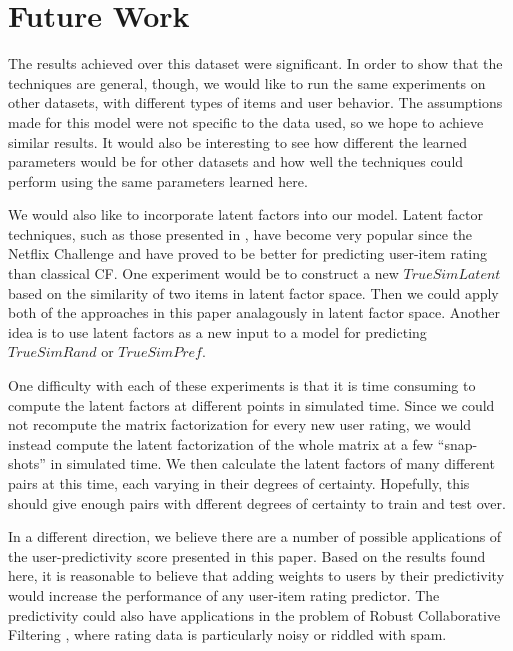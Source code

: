 \documentclass[11pt]{article}
\begin{document}
{\section*{Future Work}
The results achieved over this dataset were significant. In order to show that
the techniques are general, though, we would like to run the same experiments on
other datasets, with different types of items and user behavior. The 
assumptions made for this model were not specific to the data used, so we 
hope to achieve similar results. It would also be interesting to see how 
different the learned parameters would be for other datasets and how well 
the techniques could perform using the same parameters learned here.

We would also like to incorporate latent factors into our model.
Latent factor techniques, such as those presented in \cite{Koren2009}, have
become very popular since the Netflix Challenge and have proved to be better for
predicting user-item rating than classical CF. One experiment would be to
construct a new $TrueSimLatent$ based on the similarity of two items in 
latent factor space. Then we could apply both of the approaches in this
paper analagously in latent factor space. Another idea is to use latent factors 
as a new input to a model for predicting $TrueSimRand$ or $TrueSimPref$. 

One difficulty with each of these experiments is that it is time consuming to 
compute the latent factors at different points in simulated time. Since we could
not recompute the matrix factorization for every new user rating, we would 
instead compute the latent factorization of the whole matrix at a few 
``snap-shots'' in simulated time. We then calculate the latent factors of many
different pairs at this time, each varying in their degrees of certainty. 
Hopefully, this should give enough pairs with dfferent degrees of certainty 
to train and test over.

In a different direction, we believe there are a number of possible applications
of the user-predictivity score presented in this paper. Based on the results
found here, it is reasonable to believe that adding weights to users by their
predictivity would increase the performance of any user-item rating predictor.
The predictivity could also have applications in the problem of Robust
Collaborative Filtering \cite{Mehta2007}, where rating data is particularly noisy
or riddled with spam.

\begin{thebibliography}{9}


\end{thebibliography}}
\end{document}
